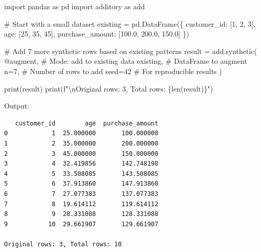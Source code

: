 \documentclass[
  letterpaper,
]{scrbook}
\newenvironment{Shaded}{\begin{snugshade}}{\end{snugshade}}
\newcommand{\BuiltInTok}[1]{\textcolor[rgb]{0.00,0.23,0.31}{#1}}
\newcommand{\CharTok}[1]{\textcolor[rgb]{0.13,0.47,0.30}{#1}}
\newcommand{\CommentTok}[1]{\textcolor[rgb]{0.37,0.37,0.37}{#1}}
\newcommand{\DecValTok}[1]{\textcolor[rgb]{0.68,0.00,0.00}{#1}}
\newcommand{\FloatTok}[1]{\textcolor[rgb]{0.68,0.00,0.00}{#1}}
\newcommand{\ImportTok}[1]{\textcolor[rgb]{0.00,0.46,0.62}{#1}}
\newcommand{\NormalTok}[1]{\textcolor[rgb]{0.00,0.23,0.31}{#1}}
\newcommand{\OperatorTok}[1]{\textcolor[rgb]{0.37,0.37,0.37}{#1}}
\newcommand{\SpecialCharTok}[1]{\textcolor[rgb]{0.37,0.37,0.37}{#1}}
\newcommand{\SpecialStringTok}[1]{\textcolor[rgb]{0.13,0.47,0.30}{#1}}
\newcommand{\StringTok}[1]{\textcolor[rgb]{0.13,0.47,0.30}{#1}}
\begin{document}
\begin{Shaded}
\begin{Highlighting}[]
\ImportTok{import}\NormalTok{ pandas }\ImportTok{as}\NormalTok{ pd}
\ImportTok{import}\NormalTok{ additory }\ImportTok{as}\NormalTok{ add}

\CommentTok{\# Start with a small dataset}
\NormalTok{existing }\OperatorTok{=}\NormalTok{ pd.DataFrame(\{}
    \StringTok{\textquotesingle{}customer\_id\textquotesingle{}}\NormalTok{: [}\DecValTok{1}\NormalTok{, }\DecValTok{2}\NormalTok{, }\DecValTok{3}\NormalTok{],}
    \StringTok{\textquotesingle{}age\textquotesingle{}}\NormalTok{: [}\DecValTok{25}\NormalTok{, }\DecValTok{35}\NormalTok{, }\DecValTok{45}\NormalTok{],}
    \StringTok{\textquotesingle{}purchase\_amount\textquotesingle{}}\NormalTok{: [}\FloatTok{100.0}\NormalTok{, }\FloatTok{200.0}\NormalTok{, }\FloatTok{150.0}\NormalTok{]}
\NormalTok{\})}

\CommentTok{\# Add 7 more synthetic rows based on existing patterns}
\NormalTok{result }\OperatorTok{=}\NormalTok{ add.synthetic(}
    \StringTok{\textquotesingle{}@augment\textquotesingle{}}\NormalTok{,              }\CommentTok{\# Mode: add to existing data}
\NormalTok{    existing,                }\CommentTok{\# DataFrame to augment}
\NormalTok{    n}\OperatorTok{=}\DecValTok{7}\NormalTok{,                     }\CommentTok{\# Number of rows to add}
\NormalTok{    seed}\OperatorTok{=}\DecValTok{42}                  \CommentTok{\# For reproducible results}
\NormalTok{)}

\BuiltInTok{print}\NormalTok{(result)}
\BuiltInTok{print}\NormalTok{(}\SpecialStringTok{f"}\CharTok{\textbackslash{}n}\SpecialStringTok{Original rows: 3, Total rows: }\SpecialCharTok{\{}\BuiltInTok{len}\NormalTok{(result)}\SpecialCharTok{\}}\SpecialStringTok{"}\NormalTok{)}
\end{Highlighting}
\end{Shaded}

Output:

\begin{verbatim}
   customer_id        age  purchase_amount
0            1  25.000000       100.000000
1            2  35.000000       200.000000
2            3  45.000000       150.000000
3            4  32.419856       142.748198
4            5  33.508085       143.508085
5            6  37.913860       147.913860
6            7  27.077383       137.077383
7            8  19.614112       119.614112
8            9  28.331088       128.331088
9           10  29.661907       129.661907

Original rows: 3, Total rows: 10
\end{verbatim}
\end{document}
